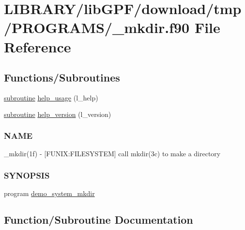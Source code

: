 \hypertarget{__mkdir_8f90}{}\section{L\+I\+B\+R\+A\+R\+Y/lib\+G\+P\+F/download/tmp/\+P\+R\+O\+G\+R\+A\+M\+S/\+\_\+mkdir.f90 File Reference}
\label{__mkdir_8f90}
\subsection*{Functions/\+Subroutines}
\begin{DoxyCompactItemize}
\item 
\hyperlink{M__stopwatch_83_8txt_acfbcff50169d691ff02d4a123ed70482}{subroutine} \hyperlink{__mkdir_8f90_a3e09a3b52ee8fb04eeb93fe5761626a8}{help\+\_\+usage} (l\+\_\+help)
\item 
\hyperlink{M__stopwatch_83_8txt_acfbcff50169d691ff02d4a123ed70482}{subroutine} \hyperlink{__mkdir_8f90_a39c21619b08a3c22f19e2306efd7f766}{help\+\_\+version} (l\+\_\+version)
\begin{DoxyCompactList}\small\item\em \subsubsection*{N\+A\+ME}

\+\_\+mkdir(1f) -\/ \mbox{[}F\+U\+N\+IX\+:F\+I\+L\+E\+S\+Y\+S\+T\+EM\mbox{]} call mkdir(3c) to make a directory \subsubsection*{S\+Y\+N\+O\+P\+S\+IS}\end{DoxyCompactList}\item 
program \hyperlink{__mkdir_8f90_a36a40ac20984c9e29c7629eea873fa77}{demo\+\_\+system\+\_\+mkdir}
\end{DoxyCompactItemize}


\subsection{Function/\+Subroutine Documentation}
\mbox{\label{__mkdir_8f90_a36a40ac20984c9e29c7629eea873fa77}} 
